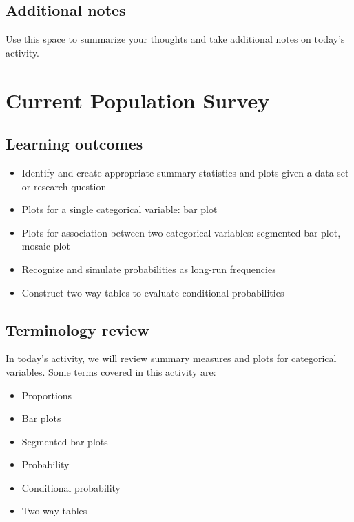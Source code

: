 \documentclass[
]{report}
\begin{document}
\hypertarget{additional-notes}{%
\section{Additional notes}\label{additional-notes}}

Use this space to summarize your thoughts and take additional notes on today's activity.

\hypertarget{current-population-survey}{%
\chapter{Current Population Survey}\label{current-population-survey}}

\hypertarget{learning-outcomes}{%
\section{Learning outcomes}\label{learning-outcomes}}

\begin{itemize}
\item
  Identify and create appropriate summary statistics and plots
  given a data set or research question
\item
  Plots for a single categorical variable: bar plot
\item
  Plots for association between two categorical variables:
  segmented bar plot, mosaic plot
\item
  Recognize and simulate probabilities as long-run frequencies
\item
  Construct two-way tables to evaluate conditional probabilities
\end{itemize}

\hypertarget{terminology-review}{%
\section{Terminology review}\label{terminology-review}}

In today's activity, we will review summary measures and plots for categorical variables. Some terms covered in this activity are:

\begin{itemize}
\item
  Proportions
\item
  Bar plots
\item
  Segmented bar plots
\item
  Probability
\item
  Conditional probability
\item
  Two-way tables
\end{itemize}
\end{document}
